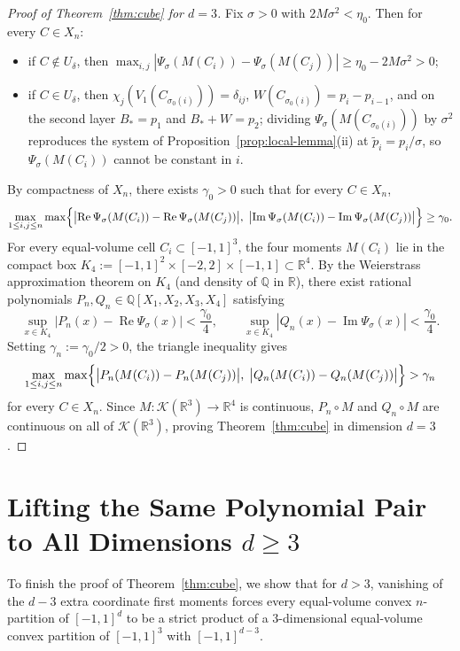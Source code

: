 \documentclass[11pt,a4paper]{amsart}
\numberwithin{equation}{section}
\theoremstyle{definition}
\newcommand{\R}{\mathbb{R}}
\newcommand{\Q}{\mathbb{Q}}
\newcommand{\Kcal}{\mathcal{K}}
\begin{document}
\begin{proof}[Proof of Theorem~\ref{thm:cube} for $d = 3$]
Fix $\sigma > 0$ with $2 M \sigma^2 < \eta_0$. Then for every $C \in X_n$:
\begin{itemize}
\item if $C \notin U_\delta$, then $\max_{i,j} |\Psi_\sigma(M(C_i)) - \Psi_\sigma(M(C_j))| \ge \eta_0 - 2 M \sigma^2 > 0$;
\item if $C \in U_\delta$, then $\chi_j(V_1(C_{\sigma_0(i)})) = \delta_{ij}$, $W(C_{\sigma_0(i)}) = p_i - p_{i-1}$, and on the second layer $B_* = p_1$ and $B_* + W = p_2$; dividing $\Psi_\sigma(M(C_{\sigma_0(i)}))$ by $\sigma^2$ reproduces the system of Proposition~\ref{prop:local-lemma}(ii) at $\tilde p_i = p_i/\sigma$, so $\Psi_\sigma(M(C_i))$ cannot be constant in $i$.
\end{itemize}
By compactness of $X_n$, there exists $\gamma_0 > 0$ such that for every $C \in X_n$,
\[
\max_{1 \le i, j \le n} \max\Bigl\{\bigl|\operatorname{Re}\Psi_\sigma(M(C_i)) - \operatorname{Re}\Psi_\sigma(M(C_j))\bigr|,\; \bigl|\operatorname{Im}\Psi_\sigma(M(C_i)) - \operatorname{Im}\Psi_\sigma(M(C_j))\bigr|\Bigr\} \ge \gamma_0.
\]
For every equal-volume cell $C_i \subset [-1,1]^3$, the four moments $M(C_i)$ lie in the compact box $K_4 := [-1,1]^2 \times [-2,2] \times [-1,1] \subset \R^4$. By the Weierstrass approximation theorem on $K_4$ (and density of $\Q$ in $\R$), there exist rational polynomials $P_n, Q_n \in \Q[X_1,X_2,X_3,X_4]$ satisfying
\[
\sup_{x \in K_4} |P_n(x) - \operatorname{Re}\Psi_\sigma(x)| < \frac{\gamma_0}{4}, \qquad
\sup_{x \in K_4} |Q_n(x) - \operatorname{Im}\Psi_\sigma(x)| < \frac{\gamma_0}{4}.
\]
Setting $\gamma_n := \gamma_0 / 2 > 0$, the triangle inequality gives
\[
\max_{1 \le i, j \le n} \max\Bigl\{\bigl|P_n(M(C_i)) - P_n(M(C_j))\bigr|,\; \bigl|Q_n(M(C_i)) - Q_n(M(C_j))\bigr|\Bigr\} > \gamma_n
\]
for every $C \in X_n$. Since $M : \Kcal(\R^3) \to \R^4$ is continuous, $P_n \circ M$ and $Q_n \circ M$ are continuous on all of $\Kcal(\R^3)$, proving Theorem~\ref{thm:cube} in dimension $d = 3$.
\end{proof}

\section{Lifting the Same Polynomial Pair to All Dimensions $d \ge 3$}
\label{sec:cube-highd}

To finish the proof of Theorem~\ref{thm:cube}, we show that for $d > 3$, vanishing of the $d-3$ extra coordinate first moments forces every equal-volume convex $n$-partition of $[-1,1]^d$ to be a strict product of a $3$-dimensional equal-volume convex partition of $[-1,1]^3$ with $[-1,1]^{d-3}$.
\end{document}
